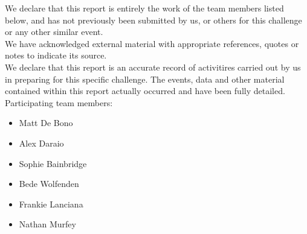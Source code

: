 We declare that this report is entirely the work of the team members listed below, and has not previously been submitted by us, or others for this challenge or any other similar event.\\

We have acknowledged external material with appropriate references, quotes or notes to indicate its source.\\

We declare that this report is an accurate record of activitires carried out by us in preparing for this specific challenge. The events, data and other material contained within this report actually occurred and have been fully detailed.\\

Participating team members:
\begin{itemize}
	\item Matt De Bono
	\item Alex Daraio
	\item Sophie Bainbridge
	\item Bede Wolfenden
	\item Frankie Lanciana
	\item Nathan Murfey
\end{itemize}